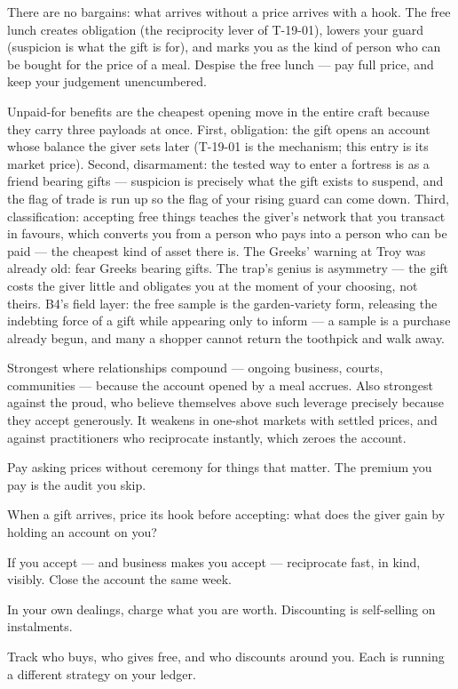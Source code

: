 \begin{core}
There are no bargains: what arrives without a price arrives with a hook. The free lunch creates obligation (the reciprocity lever of T-19-01), lowers your guard (suspicion is what the gift is for), and marks you as the kind of person who can be bought for the price of a meal. Despise the free lunch --- pay full price, and keep your judgement unencumbered.
\end{core}
\begin{mechanism}
Unpaid-for benefits are the cheapest opening move in the entire craft because they carry three payloads at once. First, obligation: the gift opens an account whose balance the giver sets later (T-19-01 is the mechanism; this entry is its market price). Second, disarmament: the tested way to enter a fortress is as a friend bearing gifts --- suspicion is precisely what the gift exists to suspend, and the flag of trade is run up so the flag of your rising guard can come down. Third, classification: accepting free things teaches the giver's network that you transact in favours, which converts you from a person who pays into a person who can be paid --- the cheapest kind of asset there is. The Greeks' warning at Troy was already old: fear Greeks bearing gifts. The trap's genius is asymmetry --- the gift costs the giver little and obligates you at the moment of your choosing, not theirs. B4's field layer: the free sample is the garden-variety form, releasing the indebting force of a gift while appearing only to inform --- a sample is a purchase already begun, and many a shopper cannot return the toothpick and walk away.
\end{mechanism}
\begin{conditions}
Strongest where relationships compound --- ongoing business, courts, communities --- because the account opened by a meal accrues. Also strongest against the proud, who believe themselves above such leverage precisely because they accept generously. It weakens in one-shot markets with settled prices, and against practitioners who reciprocate instantly, which zeroes the account.
\end{conditions}
\begin{application}
  \item Pay asking prices without ceremony for things that matter. The premium you pay is the audit you skip.
  \item When a gift arrives, price its hook before accepting: what does the giver gain by holding an account on you?
  \item If you accept --- and business makes you accept --- reciprocate fast, in kind, visibly. Close the account the same week.
  \item In your own dealings, charge what you are worth. Discounting is self-selling on instalments.
  \item Track who buys, who gives free, and who discounts around you. Each is running a different strategy on your ledger.
\end{application}
